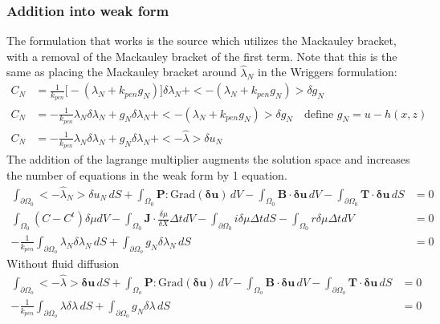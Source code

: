 \documentclass[12pt,3p]{article}
\begin{document}
\subsubsection{Addition into weak form}
The formulation that works is the source which utilizes the Mackauley bracket, with a removal of the Mackauley bracket of the first term. Note that this is the same as placing the Mackauley bracket around $\hat{\lambda}_N$ in the Wriggers formulation: 
\begin{align*}
C_N &= \frac{1}{k_{pen}} \big[- (\lambda_N + k_{pen} g_N) \big] \delta \lambda_N + <-(\lambda_N + k_{pen} g_N) > \delta g_N \\
C_N &= - \frac{1}{k_{pen}} \lambda_N \delta \lambda_N + g_N \delta \lambda_N + <-(\lambda_N + k_{pen} g_N) > \delta g_N \quad \text{define } g_N = u - h(x, z) \\
C_N &= - \frac{1}{k_{pen}} \lambda_N \delta \lambda_N + g_N \delta \lambda_N + < - \hat{\lambda} > \delta u_N 
\end{align*}
The addition of the lagrange multiplier augments the solution space and increases the number of equations in the weak form by 1 equation. 
\begin{align*}
 \int_{\partial \Omega_0} < - \hat{\lambda}_N > \delta u_N \, dS +\int_{\Omega_0} \mathbf{P} : \text{Grad}(\pmb{\delta} \mathbf{u} ) \, dV - \int_{\Omega_0} \mathbf{B} \cdot \pmb{\delta} \mathbf{u} \, dV - \int_{\partial \Omega_0} \mathbf{T} \cdot \pmb{\delta} \mathbf{u} \, dS  &= 0 \\
 \int_{\Omega_0} \left(C-C^{t}\right) \delta \mu d V-\int_{\Omega_0} \mathbf{J} \cdot \frac{\delta \mu}{\delta X} \Delta t d V - \int_{\partial \Omega_0} i \delta \mu \Delta t d S-\int_{\Omega_0} r \delta \mu \Delta t d V &=0 \\
- \frac{1}{k_{pen}} \int_{\partial \Omega_o} \lambda_N \delta \lambda_N \, dS +  \int_{\partial \Omega_o}  g_N \delta \lambda_N \, dS &= 0 
\end{align*}
Without fluid diffusion
\begin{align*}
 \int_{\partial \Omega_o} < - \hat{\lambda} > \pmb{\delta} \mathbf{u} \, dS +\int_{\Omega_o} \mathbf{P} : \text{Grad}(\pmb{\delta} \mathbf{u} ) \, dV - \int_{\Omega_o} \mathbf{B} \cdot \pmb{\delta} \mathbf{u} \, dV - \int_{\partial \Omega_o} \mathbf{T} \cdot \pmb{\delta} \mathbf{u} \, dS  &= 0 \\
- \frac{1}{k_{pen}} \int_{\partial \Omega_o} \lambda \delta \lambda \, dS +  \int_{\partial \Omega_o}  g_N \delta \lambda \, dS &= 0 
\end{align*}
\end{document}
